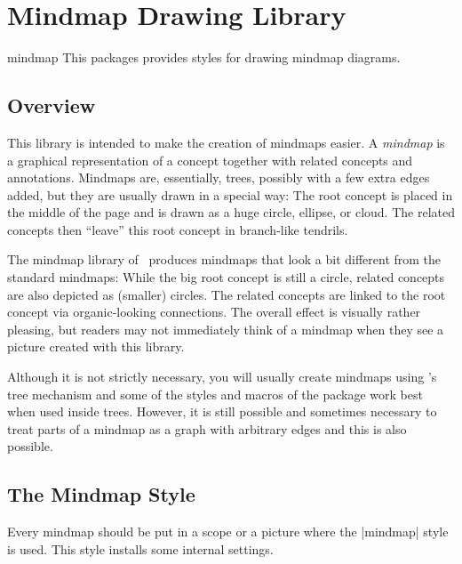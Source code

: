 %
%
%

\section{Mindmap Drawing Library}

\begin{tikzlibrary}{mindmap}
  This packages provides styles for drawing mindmap diagrams.
\end{tikzlibrary}

\subsection{Overview}

This library is intended to make the creation of mindmaps easier. A
\emph{mindmap} is a graphical representation of a concept together
with related concepts and annotations. Mindmaps are, essentially,
trees, possibly with a few extra edges added, but they are usually
drawn in a special way: The root concept is placed in the middle of
the page and is drawn as a huge circle, ellipse, or cloud. The related
concepts then ``leave'' this root concept in branch-like tendrils.

The mindmap library of \tikzname\ produces mindmaps that look a bit
different from the standard mindmaps: While the big root concept is
still a circle, related concepts are also depicted as (smaller)
circles. The related concepts are linked to the root concept via
organic-looking connections. The overall effect is visually rather
pleasing, but readers may not immediately think of a mindmap when they
see a picture created with this library.

Although it is not strictly necessary, you will usually create
mindmaps using \tikzname's tree mechanism and some of the styles and
macros of the package work best when used inside trees. However, it is
still possible and sometimes necessary to treat parts of a mindmap as
a graph with arbitrary edges and this is also possible.


\subsection{The Mindmap Style}

Every mindmap should be put in a scope or a picture where the
|mindmap| style is used. This style installs some internal settings.

